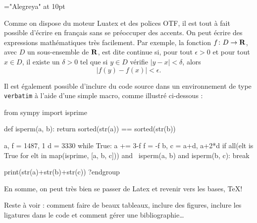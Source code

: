 \ifdefined\directlua
  
\fi
\font\tenrm="Alegreya" at 10pt
\tenrm



\parindent 0pt

Comme on dispose du moteur Luatex et des polices OTF, il est tout à fait possible d'écrire en français sans se préoccuper des accents. On peut écrire des expressions mathématiques très facilement. Par exemple, la fonction $f \colon D \to {\bf R}$, avec $D$ un sous-ensemble de $\bf R$, est dite continue si, pour tout $\epsilon > 0$ et pour tout $x \in D$, il existe un $\delta > 0$ tel que si $y \in D$ vérifie $|y - x| < \delta$, alors $$|f(y) - f(x)| < \epsilon.$$

Il est également possible d'inclure du code source dans un environnement de type {\tt verbatim} à l'aide d'une simple macro, comme illustré ci-dessous :
\bigskip

\verbatim
from sympy import isprime

def isperm(a, b):
    return sorted(str(a)) == sorted(str(b))

a, f = 1487, 1
d = 3330
while True:
    a += 3-f
    f = -f
    b, c = a+d, a+2*d
    if all(elt is True for elt in map(isprime, [a, b, c])) and \
       isperm(a, b) and isperm(b, c):
        break

print(str(a)+str(b)+str(c))
?endgroup

\bigskip
En somme, on peut très bien se passer de Latex et revenir vers les bases, \TeX !

Reste à voir : comment faire de beaux tableaux, inclure des figures, inclure les ligatures dans le code et comment gérer une bibliographie\dots
\bye

